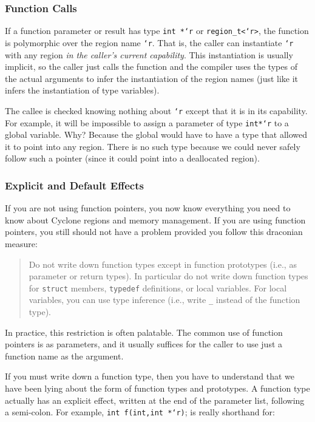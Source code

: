 \subsubsection{Function Calls}

If a function parameter or result has type \texttt{int *`r} or
\texttt{region_t<`r>}, the function is polymorphic over the region name
\texttt{`r}.  That is, the caller can instantiate \texttt{`r} with any
region \emph{in the caller's current capability}. This instantiation
is usually implicit, so the caller just calls the function and the
compiler uses the types of the actual arguments to infer the
instantiation of the region names (just like it infers the
instantiation of type variables).

The callee is checked knowing nothing about \texttt{`r} except that it
is in its capability.  For example, it will be impossible to assign a
parameter of type \texttt{int*`r} to a global variable.  Why?  Because
the global would have to have a type that allowed it to point into any
region.  There is no such type because we could never safely follow
such a pointer (since it could point into a deallocated region).

\subsubsection{Explicit and Default Effects}

If you are not using function pointers, you now know everything you
need to know about Cyclone regions and memory management.  If you are
using function pointers, you still should not have a problem provided
you follow this draconian measure:
\begin{quote}
  Do not write down function types except in function prototypes
  (i.e., as parameter or return types).  In particular do not write
  down function types for \texttt{struct} members, \texttt{typedef}
  definitions, or local variables.  For local variables, you can use
  type inference (i.e., write \texttt{_} instead of the function type).
\end{quote}

In practice, this restriction is often palatable.  The common use of
function pointers is as parameters, and it usually suffices for the
caller to use just a function name as the argument.

If you must write down a function type, then you have to understand
that we have been lying about the form of function types and
prototypes.  A function type actually has an explicit effect, written
at the end of the parameter list, following a semi-colon.  For
example, \texttt{int f(int,int *`r)}; is really shorthand for:

